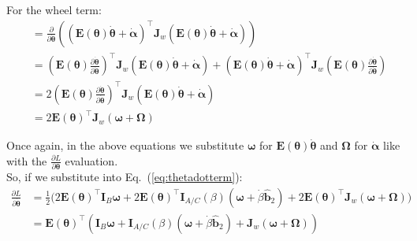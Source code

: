\documentclass[titlepage]{article}
\begin{document}
For the wheel term:
\begin{equation}
	\begin{split}
		&=\frac{\partial}{\partial\dot{\boldsymbol{\theta}}}\left(\left(\boldsymbol{E}(\boldsymbol{\theta})\dot{\boldsymbol{\theta}}+\dot{\boldsymbol{\alpha}}\right)^\top\boldsymbol{J}_w\left(\boldsymbol{E}(\boldsymbol{\theta})\dot{\boldsymbol{\theta}}+\dot{\boldsymbol{\alpha}}\right)\right) \\
		&=\left(\boldsymbol{E}(\boldsymbol{\theta})\frac{\partial\dot{\boldsymbol{\theta}}}{\partial\dot{\boldsymbol{\theta}}}\right)^\top\boldsymbol{J}_w\left(\boldsymbol{E}(\boldsymbol{\theta})\dot{\boldsymbol{\theta}}+\dot{\boldsymbol{\alpha}}\right)+\left(\boldsymbol{E}(\boldsymbol{\theta})\dot{\boldsymbol{\theta}}+\dot{\boldsymbol{\alpha}}\right)^\top\boldsymbol{J}_w\left(\boldsymbol{E}(\boldsymbol{\theta})\frac{\partial\dot{\boldsymbol{\theta}}}{\partial\dot{\boldsymbol{\theta}}}\right) \\
		&=2\left(\boldsymbol{E}(\boldsymbol{\theta})\frac{\partial\dot{\boldsymbol{\theta}}}{\partial\dot{\boldsymbol{\theta}}}\right)^\top\boldsymbol{J}_w\left(\boldsymbol{E}(\boldsymbol{\theta})\dot{\boldsymbol{\theta}}+\dot{\boldsymbol{\alpha}}\right) \\
		&=2\boldsymbol{E}(\boldsymbol{\theta})^\top\boldsymbol{J}_w\left(\boldsymbol{\omega}+\boldsymbol{\Omega}\right)
	\end{split}
\end{equation}

Once again, in the above equations we substitute $\boldsymbol{\omega}$ for $\boldsymbol{E}(\boldsymbol{\theta})\dot{\boldsymbol{\theta}}$ and $\boldsymbol{\Omega}$ for $\dot{\boldsymbol{\alpha}}$ like with the $\frac{\partial L}{\partial\boldsymbol{\theta}}$ evaluation.\\

So, if we substitute into Eq.~(\ref{eq:thetadotterm}):
\begin{equation}
	\begin{split}
		\frac{\partial L}{\partial\dot{\boldsymbol{\theta}}}&=\frac{1}{2}\bigg(2\boldsymbol{E}(\boldsymbol{\theta})^\top\boldsymbol{I}_B\boldsymbol{\omega}+2\boldsymbol{E}(\boldsymbol{\theta})^\top\boldsymbol{I}_{A/C}(\beta)\left(\boldsymbol{\omega}+\dot{\beta}\hat{\boldsymbol{b}}_2\right)+2\boldsymbol{E}(\boldsymbol{\theta})^\top\boldsymbol{J}_w\left(\boldsymbol{\omega}+\boldsymbol{\Omega}\right)\bigg) \\
		&=\boldsymbol{E}(\boldsymbol{\theta})^\top\left(\boldsymbol{I}_B\boldsymbol{\omega}+\boldsymbol{I}_{A/C}(\beta)\left(\boldsymbol{\omega}+\dot{\beta}\hat{\boldsymbol{b}}_2\right)+\boldsymbol{J}_w\left(\boldsymbol{\omega}+\boldsymbol{\Omega}\right)\right) \\
	\end{split}
\end{equation}
\end{document}
